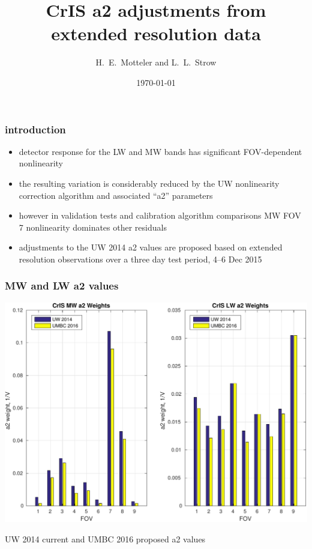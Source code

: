 \documentclass[11pt]{beamer}
\title{CrIS a2 adjustments from \\ 
       extended resolution data
}
\author{H.~E.~Motteler and L.~L.~Strow}
\institute{
UMBC Atmospheric Spectroscopy Lab \\
  Joint Center for Earth Systems Technology \\
}
\date{\today}
\begin{document}
\begin{frame}[plain]
\titlepage
\end{frame}
\begin{frame}
\frametitle{introduction}

\begin{itemize}

  \item detector response for the {\cris} LW and MW bands has
    significant FOV-dependent nonlinearity

 \item the resulting variation is considerably reduced by the 
   UW nonlinearity correction algorithm and associated ``a2''
   parameters

  \item however in validation tests and calibration algorithm
    comparisons MW FOV 7 nonlinearity dominates other residuals

  \item adjustments to the UW 2014 a2 values are proposed based on
    extended resolution observations over a three day test period,
    4--6 Dec 2015

\end{itemize}

\end{frame}
\begin{frame}
\frametitle{MW and LW a2 values}
\begin{center}
  \includegraphics[scale=0.5]{figures/a2_proposed_all.pdf}
\end{center}
\begin{center}
  UW 2014 current and UMBC 2016 proposed a2 values
\end{center}
\end{frame}
\end{document}
